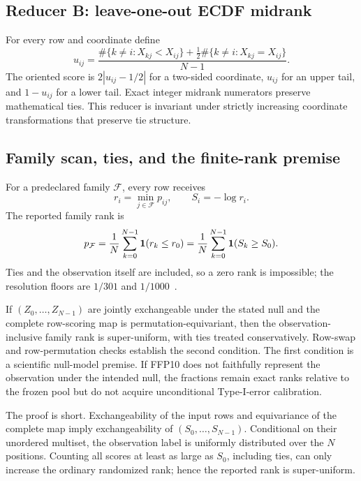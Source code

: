 \documentclass[11pt,a4paper]{article}
\begin{document}
\subsection{Reducer B: leave-one-out ECDF midrank}

For every row and coordinate define
\begin{equation}
u_{ij}=\frac{
\#\{k\ne i:X_{kj}<X_{ij}\}
+\tfrac12\#\{k\ne i:X_{kj}=X_{ij}\}}
{N-1}.
\label{eq:ecdf-midrank}
\end{equation}
The oriented score is $2|u_{ij}-1/2|$ for a two-sided coordinate, $u_{ij}$
for an upper tail, and $1-u_{ij}$ for a lower tail.  Exact integer midrank
numerators preserve mathematical ties.  This reducer is invariant under
strictly increasing coordinate transformations that preserve tie structure.

\subsection{Family scan, ties, and the finite-rank premise}

For a predeclared family $\mathcal F$, every row receives
\begin{equation}
r_i=\min_{j\in\mathcal F}p_{ij},
\qquad S_i=-\log r_i.
\end{equation}
The reported family rank is
\begin{equation}
p_{\mathcal F}
=\frac1N\sum_{k=0}^{N-1}{\bf1}(r_k\le r_0)
=\frac1N\sum_{k=0}^{N-1}{\bf1}(S_k\ge S_0).
\label{eq:family-rank}
\end{equation}
Ties and the observation itself are included, so a zero rank is impossible;
the resolution floors are $1/301$ and $1/1000$~\cite{PhipsonSmyth2010}.

If $(Z_0,\ldots,Z_{N-1})$ are jointly exchangeable under the stated null and
the complete row-scoring map is permutation-equivariant, then the
observation-inclusive family rank is super-uniform, with ties treated
conservatively.  Row-swap and row-permutation checks establish the second
condition.  The first condition is a scientific null-model premise.  If FFP10
does not faithfully represent the observation under the intended null, the
fractions remain exact ranks relative to the frozen pool but do not acquire
unconditional Type-I-error calibration.

The proof is short.  Exchangeability of the input rows and equivariance of the
complete map imply exchangeability of $(S_0,\ldots,S_{N-1})$.  Conditional on
their unordered multiset, the observation label is uniformly distributed over
the $N$ positions.  Counting all scores at least as large as $S_0$, including
ties, can only increase the ordinary randomized rank; hence the reported rank
is super-uniform.
\end{document}
